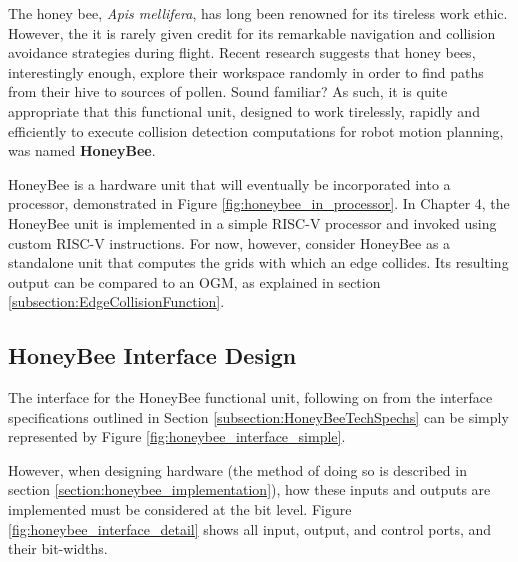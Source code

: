 


The honey bee, \textit{Apis mellifera}, has long been renowned for its tireless work ethic. However, the it is rarely given credit for its remarkable navigation and collision avoidance strategies during flight. Recent research\cite{Menzel2005} suggests that honey bees, interestingly enough, explore their workspace randomly in order to find paths from their hive to sources of pollen. Sound familiar? As such, it is quite appropriate that this functional unit, designed to work tirelessly, rapidly and efficiently to execute collision detection computations for robot motion planning, was named \textbf{HoneyBee}. \\
\bigskip

HoneyBee is a hardware unit that will eventually be incorporated into a processor, demonstrated in Figure \ref{fig:honeybee_in_processor}. In Chapter 4, the HoneyBee unit is implemented in a simple RISC-V processor and invoked using custom RISC-V instructions. For now, however, consider HoneyBee as a standalone unit that computes the grids with which an edge collides. Its resulting output can be compared to an \gls{OGM}, as explained in section \ref{subsection:EdgeCollisionFunction}.



\subsection{HoneyBee Interface Design}
    The interface for the HoneyBee functional unit, following on from the interface specifications outlined in Section \ref{subsection:HoneyBeeTechSpechs} can be simply represented by Figure \ref{fig:honeybee_interface_simple}.

    
    
    However, when designing hardware (the method of doing so is described in section \ref{section:honeybee_implementation}), how these inputs and outputs are implemented must be considered at the \gls{bit} level. Figure \ref{fig:honeybee_interface_detail} shows all input, output, and control ports, and their \glspl{bit-width}. 
    
    

